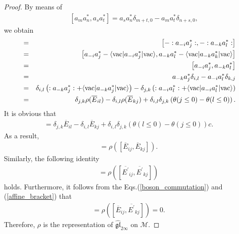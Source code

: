 \documentclass[10pt,a4paper]{amsart}
\numberwithin{equation}{section}
\begin{document}
\begin{proof}
By means of
\begin{eqnarray}\label{boson_four_relation}
&&\left[a_{m}a^{\ast}_{n},a_{s}a^{\ast}_{t}\right]=a_{s}a^{\ast}_{n}\delta_{m+t,0}
-a_{m}a^{\ast}_{t}\delta_{n+s,0},
\end{eqnarray}
we obtain
\begin{eqnarray}
[\rho(\overline{E}_{ij}),\rho(\overline{E}_{kj})]
&=&\left[-:a_{-i}a^{\ast}_{j}:,
-:a_{-k}a^{\ast}_{l}:\right]\notag\\
&=&\left[a_{-i}a^{\ast}_{j}-\langle\text{vac}|a_{-i}a^{\ast}_{j}|\text{vac}\rangle,
a_{-k}a^{\ast}_{l}-\langle\text{vac}|a_{-k}a^{\ast}_{k}|\text{vac}\rangle\right]\notag\\
&=&\left[a_{-i}a^{\ast}_{j},a_{-k}a^{\ast}_{l}\right]\notag\\
&=&a_{-k}a^{\ast}_{j}\delta_{i,l}-a_{-i}a^{\ast}_{l}\delta_{k,j}\notag\\
&=&\delta_{i,l}\left(:a_{-k}a^{\ast}_{j}:+\langle\text{vac}|a_{-k}a^{\ast}_{j}|
\text{vac}\rangle\right)-\delta_{j,k}\left(:a_{-i}a^{\ast}_{l}:+\langle\text{vac}|a_{-i}
a^{\ast}_{l}|\text{vac}\rangle\right)\notag\\
&=&\delta_{j,k}\rho(\overline{E}_{il})-\delta_{i,l}\rho(\overline{E}_{kj})
+\delta_{i,l}\delta_{j,k}\left(\theta(j\leq0)-\theta(l\leq0)\right).
\end{eqnarray}
It is obvious that
\begin{eqnarray}
[\overline{E}_{ij},\overline{E}_{kj}]=\delta_{j,k}\overline{E}_{il}
-\delta_{i,l}\overline{E}_{kj}+\delta_{i,l}\delta_{j,k}
\left(\theta(l\leq0)-\theta(j\leq0)\right)c.
\end{eqnarray}
As a result,
\begin{eqnarray}
[\rho(\overline{E}_{ij}),\rho(\overline{E}_{kj})]=\rho\left(
[\overline{E}_{ij},\overline{E}_{kj}]\right).
\end{eqnarray}
Similarly, the following  identity
\begin{eqnarray}
[\rho(\overline{E^{\prime}}_{ij}),\rho(\overline{E^{\prime}}_{kj})]=\rho\left(
[\overline{E^{\prime}}_{ij},\overline{E^{\prime}}_{kj}]\right)
\end{eqnarray}
holds. Furthermore, it follows from the Eqs.(\ref{boson_commutation}) and (\ref{affine_bracket}) that
\begin{eqnarray}
[\rho(\overline{E}_{ij}),\rho(\overline{E^{\prime}}_{kj})]
=\rho\left([\overline{E}_{ij},\overline{E^{\prime}}_{kj}]\right)=0.
\end{eqnarray}
Therefore, $\rho$ is the representation of $\mathfrak{\widehat{gl}}_{2\infty}$ on $\mathcal{M}$.
\end{proof}
\end{document}
